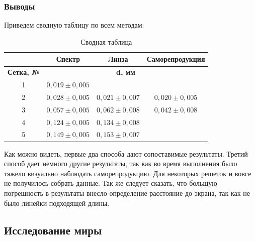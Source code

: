 \documentclass[a4paper, 12pt]{article}
\begin{document}
\subsubsection*{Выводы}

Приведем сводную таблицу по всем методам:

\begin{table}[H]
	\centering
	\begin{tabular}{|c|ccc|}
	\hline
	\textbf{}         & \multicolumn{1}{c|}{\textbf{Спектр}} & \multicolumn{1}{c|}{\textbf{Линза}} & \textbf{Саморепродукция} \\ \hline
	\textbf{Сетка, №} & \multicolumn{3}{c|}{\textbf{d, мм}}                                                                   \\ \hline
	1                 & \multicolumn{1}{c|}{$0,019 \pm 0,005$}           & \multicolumn{1}{c|}{}               &                          \\ \hline
	2                 & \multicolumn{1}{c|}{$0,028 \pm 0,005$}           & \multicolumn{1}{c|}{$0,021 \pm 0,007$}          & $0,020 \pm 0,005$                   \\ \hline
	3                 & \multicolumn{1}{c|}{$0,057 \pm 0,005$}           & \multicolumn{1}{c|}{$0,062 \pm 0,008$}          & $0,042 \pm 0,008$                   \\ \hline
	4                 & \multicolumn{1}{c|}{$0,124 \pm 0,005$}           & \multicolumn{1}{c|}{$0,134 \pm 0,008$}          &                          \\ \hline
	5                 & \multicolumn{1}{c|}{$0,149 \pm 0,005$}           & \multicolumn{1}{c|}{$0,153 \pm 0,007$}          &                          \\ \hline
	\end{tabular}
	\caption{Сводная таблица}
	\label{tab:res}
	\end{table}

Как можно видеть, первые два способа дают сопоставимые результаты. Третий способ дает немного другие результаты, так как во время выполнения было тяжело визуально наблюдать саморепродукцию. Для некоторых решеток и вовсе не получилось собрать данные.
Так же следует сказать, что большую погрешность в результаты внесло определение расстояние до экрана, так как не было линейки подходящей длины.

\subsection{Исследование миры}
\end{document}
